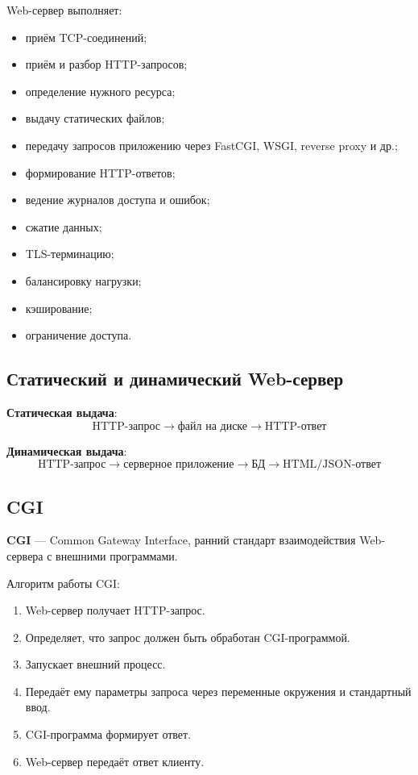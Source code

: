 \documentclass[12pt,a4paper]{article}
\begin{document}
Web-сервер выполняет:
\begin{itemize}
    \item приём TCP-соединений;
    \item приём и разбор HTTP-запросов;
    \item определение нужного ресурса;
    \item выдачу статических файлов;
    \item передачу запросов приложению через FastCGI, WSGI, reverse proxy и др.;
    \item формирование HTTP-ответов;
    \item ведение журналов доступа и ошибок;
    \item сжатие данных;
    \item TLS-терминацию;
    \item балансировку нагрузки;
    \item кэширование;
    \item ограничение доступа.
\end{itemize}

\subsection{Статический и динамический Web-сервер}

\textbf{Статическая выдача}:
\[
\text{HTTP-запрос} \rightarrow \text{файл на диске} \rightarrow \text{HTTP-ответ}
\]

\textbf{Динамическая выдача}:
\[
\text{HTTP-запрос} \rightarrow \text{серверное приложение} \rightarrow \text{БД} \rightarrow \text{HTML/JSON-ответ}
\]

\subsection{CGI}

\textbf{CGI} --- Common Gateway Interface, ранний стандарт взаимодействия Web-сервера с внешними программами.

Алгоритм работы CGI:
\begin{enumerate}
    \item Web-сервер получает HTTP-запрос.
    \item Определяет, что запрос должен быть обработан CGI-программой.
    \item Запускает внешний процесс.
    \item Передаёт ему параметры запроса через переменные окружения и стандартный ввод.
    \item CGI-программа формирует ответ.
    \item Web-сервер передаёт ответ клиенту.
\end{enumerate}
\end{document}
